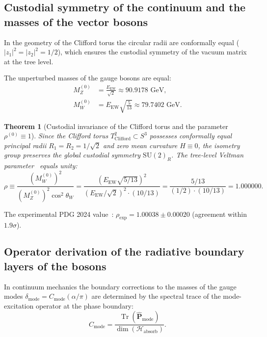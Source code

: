 \documentclass[11pt,a4paper]{article}
\newtheorem{theorem}{Theorem}
\theoremstyle{definition}
\theoremstyle{remark}
\begin{document}
\subsection{Custodial symmetry of the continuum and the masses of the vector bosons}
	
In the geometry of the Clifford torus the circular radii are conformally equal ($|z_1|^2 = |z_2|^2 = 1/2$), which ensures the custodial symmetry of the vacuum matrix at the tree level.
	
The unperturbed masses of the gauge bosons are equal:
\begin{align}
	M_Z^{(0)} &= \frac{E_{\mathrm{EW}}}{\sqrt{2}} \approx 90.9178\text{ GeV}, \label{eq:m_z_bare_exact} \\
	M_W^{(0)} &= E_{\mathrm{EW}} \sqrt{\frac{5}{13}} \approx 79.7402\text{ GeV}. \label{eq:m_w_bare_exact}
\end{align}
	
\begin{theorem}[Custodial invariance of the Clifford torus and the parameter $\rho^{(0)} \equiv 1$]
\label{thm:custodial_symmetry_clifford}
Since the Clifford torus $T^2_{\mathrm{Clifford}} \subset S^3$ possesses conformally equal principal radii $R_1 = R_2 = 1/\sqrt{2}$ and zero mean curvature $H \equiv 0$, the isometry group preserves the global custodial symmetry $\mathrm{SU}(2)_R$. The tree-level Veltman parameter~\cite{Veltman1977} equals unity:
\begin{equation}
	\rho \equiv \frac{\left(M_W^{(0)}\right)^2}{\left(M_Z^{(0)}\right)^2 \cos^2\theta_W} = \frac{\left(E_{\mathrm{EW}}\sqrt{5/13}\right)^2}{\left(E_{\mathrm{EW}}/\sqrt{2}\right)^2 \cdot (10/13)} = \frac{5/13}{(1/2) \cdot (10/13)} = 1.000000.
\label{eq:rho_tree_exact}
\end{equation}
\end{theorem}
The experimental PDG 2024 value~\cite{PDG2024}: $\rho_{\mathrm{exp}} = 1.00038 \pm 0.00020$ (agreement within $1.9\sigma$).
	
\subsection{Operator derivation of the radiative boundary layers of the bosons}

In continuum mechanics the boundary corrections to the masses of the gauge modes $\delta_{\mathrm{mode}} = C_{\mathrm{mode}} (\alpha/\pi)$ are determined by the spectral trace of the mode-excitation operator at the phase boundary:
\begin{equation}
    C_{\mathrm{mode}} = \frac{\operatorname{Tr}(\hat{\mathbf{P}}_{\mathrm{mode}})}{\dim(\mathcal{H}_{\mathrm{absorb}})}.
    \label{eq:operator_trace_general_formula}
\end{equation}
\end{document}
